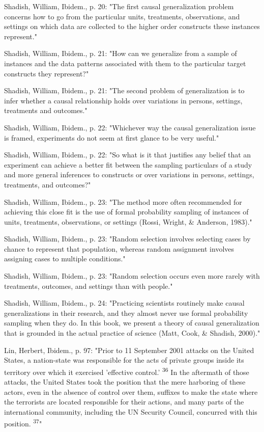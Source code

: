 Shadish, William, Ibidem., p. 20: "The first causal generalization problem concerns how to go from the particular units, treatments, observations, and settings on which data are collected to the higher order constructs these instances represent."

Shadish, William, Ibidem., p. 21: "How can we generalize from a sample of instances and the data patterns associated with them to the particular target constructs they represent?"

Shadish, William, Ibidem., p. 21: "The second problem of generalization is to infer whether a causal relationship holds over variations in persons, settings, treatments and outcomes."

Shadish, William, Ibidem., p. 22: "Whichever way the causal generalization issue is framed, experiments do not seem at first glance to be very useful."

Shadish, William, Ibidem., p. 22: "So what is it that justifies any belief that an experiment can achieve a better fit between the sampling particulars of a study and more general inferences to constructs or over variations in persons, settings, treatments, and outcomes?"

Shadish, William, Ibidem., p. 23: "The method more often recommended for achieving this close fit is the use of formal probability sampling of instances of units, treatments, observations, or settings (Rossi, Wright, \& Anderson, 1983)."

Shadish, William, Ibidem., p. 23: "Random selection involves selecting cases by chance to represent that population, whereas random assignment involves assigning cases to multiple conditions."

Shadish, William, Ibidem., p. 23: "Random selection occurs even more rarely with treatments, outcomes, and settings than with people."

Shadish, William, Ibidem., p. 24: "Practicing scientists routinely make causal generalizations in their research, and they almost never use formal probability sampling when they do. In this book, we present a theory of causal generalization that is grounded in the actual practice of science (Matt, Cook, \& Shadish, 2000)."

Lin, Herbert, Ibidem., p. 97: "Prior to 11 September 2001 attacks on the United States, a nation-state was responsible for the acts of private groups inside its territory over which it exercised 'effective control.' \textsuperscript{36} In the aftermath of those attacks, the United States took the position that the mere harboring of these actors, even in the absence of control over them, suffixes to make the state where the terrorists are located responsible for their actions, and many parts of the international community, including the UN Security Council, concurred with this position. \textsuperscript{37}"

